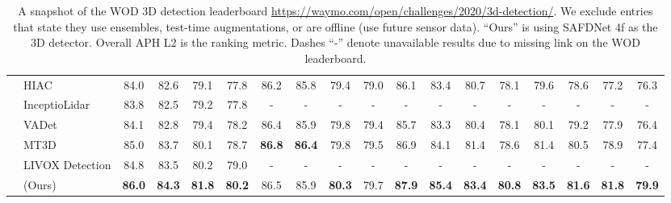 \begin{table}[]
\begin{tabular}{@{}llcccccccccccccccc@{}}
    & HIAC                                           & 84.0 & 82.6 & 79.1 & 77.8 & 86.2 & 85.8 & 79.4 & 79.0 & 86.1 & 83.4 & 80.7 & 78.1 & 79.6 & 78.6 & 77.2 & 76.3 \\
    & InceptioLidar                                  & 83.8 & 82.5 & 79.2 & 77.8 & - & - & - & - & - & - & - & - & - & - & - & -  \\
    & VADet                                          & 84.1 & 82.8 & 79.4 & 78.2 & 86.4 & 85.9 & 79.8 & 79.4 & 85.7 & 83.3 & 80.4 & 78.1 & 80.1 & 79.2 & 77.9 & 76.4 \\
    & MT3D                                           & 85.0 & 83.7 & 80.1 & 78.7 & \textbf{86.8} & \textbf{86.4} & 79.8 & 79.5 & 86.9 & 84.1 & 81.4 & 78.6 & 81.4 & 80.5 & 78.9 & 77.4 \\
    & LIVOX Detection                                & 84.8 & 83.5 & 80.2 & 79.0 & - & - & - & - & - & - & - & - & - & - & - & -  \\
    \rowcolor{tablecolor}
    & \ourmodel{} (Ours)                             & \textbf{86.0} & \textbf{84.3} & \textbf{81.8} & \textbf{80.2} & 86.5 & 85.9  & \textbf{80.3}  & 79.7 & \textbf{87.9} & \textbf{85.4} & \textbf{83.4} & \textbf{80.8} & \textbf{83.5} & \textbf{81.6} & \textbf{81.8} & \textbf{79.9} \\ \bottomrule
    \end{tabular}
    \caption{A snapshot of the WOD 3D detection leaderboard \href{https://waymo.com/open/challenges/2020/3d-detection/}{https://waymo.com/open/challenges/2020/3d-detection/}.
    We exclude entries that state they use ensembles, test-time augmentations, or are offline (use future sensor data).
    ``Ours'' is using SAFDNet 4f as the 3D detector. Overall APH L2 is the ranking metric.
    Dashes ``-'' denote unavailable results due to missing link on the WOD leaderboard.
    }
    \label{tab:full-leaderboard-all-classes}
\end{table}